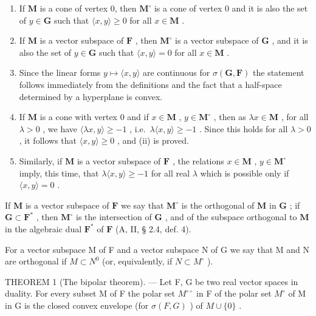 \begin{enumerate}
\def\labelenumi{(\roman{enumi})}
\setcounter{enumi}{1}
\item
  If \(\mathbf{M}\) is a cone of vertex 0, then \(\mathbf{M}^{\circ}\) is a cone of vertex 0 and it is also the set of \(y\in \mathbf{G}\) such that \(\langle x,y\rangle \geqslant 0\) for all \(x\in \mathbf{M}\) .
\item
  If \(\mathbf{M}\) is a vector subspace of \(\mathbf{F}\) , then \(\mathbf{M}^{\circ}\) is a vector subspace of \(\mathbf{G}\) , and it is also the set of \(y \in \mathbf{G}\) such that \(\langle x, y \rangle = 0\) for all \(x \in \mathbf{M}\) .
\item
  Since the linear forms \(y \mapsto \langle x, y \rangle\) are continuous for \(\sigma(\mathbf{G}, \mathbf{F})\) the statement follows immediately from the definitions and the fact that a half-space determined by a hyperplane is convex.
\item
  If \(\mathbf{M}\) is a cone with vertex 0 and if \(x \in \mathbf{M}\) , \(y \in \mathbf{M}^{\circ}\) , then as \(\lambda x \in \mathbf{M}\) , for all \(\lambda > 0\) , we have \(\langle \lambda x, y \rangle \geqslant -1\) , i.e.~\(\lambda \langle x, y \rangle \geqslant -1\) . Since this holds for all \(\lambda > 0\) , it follows that \(\langle x, y \rangle \geqslant 0\) , and (ii) is proved.
\item
  Similarly, if \(\mathbf{M}\) is a vector subspace of \(\mathbf{F}\) , the relations \(x \in \mathbf{M}\) , \(y \in \mathbf{M}^{\circ}\) imply, this time, that \(\lambda \langle x, y \rangle \geqslant -1\) for all real \(\lambda\) which is possible only if \(\langle x, y \rangle = 0\) .
\end{enumerate}

If \(\mathbf{M}\) is a vector subspace of \(\mathbf{F}\) we say that \(\mathbf{M}^{\circ}\) is the orthogonal of \(\mathbf{M}\) in \(\mathbf{G}\) ; if \(\mathbf{G} \subset \mathbf{F}^{*}\) , then \(\mathbf{M}^{\circ}\) is the intersection of \(\mathbf{G}\) , and of the subspace orthogonal to \(\mathbf{M}\) in the algebraic dual \(\mathbf{F}^{*}\) of \(\mathbf{F}\) (A, II, § 2.4, def. 4).

For a vector subspace M of F and a vector subspace N of G we say that M and N are orthogonal if \(M \subset N^{0}\) (or, equivalently, if \(N \subset M^{\circ}\) ).

THEOREM 1 (The bipolar theorem). --- Let F, G be two real vector spaces in duality. For every subset M of F the polar set \(M^{\circ\circ}\) in F of the polar set \(M^{\circ}\) of M in G is the closed convex envelope (for \(\sigma(F, G)\) ) of \(M \cup \{0\}\) .

